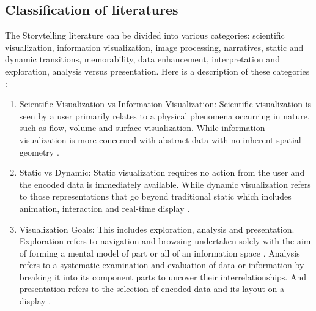 \documentclass{egpubl}
\begin{document}
\subsection{Classification of literatures}
The Storytelling literature can be divided into various categories: scientific visualization, information visualization, image processing, narratives, static and dynamic transitions, memorability, data enhancement, interpretation and exploration, analysis versus presentation. Here is a description of these categories :
\begin{enumerate}
\item Scientific Visualization vs Information Visualization: Scientific visualization is seen by a user primarily relates to a physical phenomena occurring in nature, such as flow, volume and surface visualization. While information visualization is more concerned with abstract data with no inherent spatial geometry \cite{spence2007}.
\item Static vs Dynamic: Static visualization requires no action from the user and the encoded data is immediately available. While dynamic visualization refers to those representations that go beyond traditional static which includes animation, interaction and real-time display \cite{spence2007}.
\item Visualization Goals: This includes exploration, analysis and presentation. Exploration refers to navigation and browsing undertaken solely with the aim of forming a mental model of part or all of an information space \cite{spence2007}. Analysis refers to a systematic examination and evaluation of data or information by breaking it into its component parts to uncover their interrelationships. And presentation refers to the selection of encoded data and its layout on a display \cite{spence2007}.
\end{enumerate}
\end{document}
